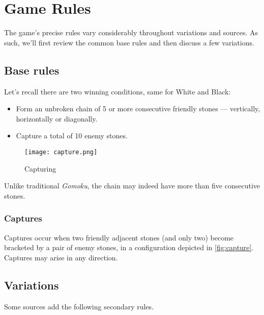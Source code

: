 \documentclass[12pt,a4paper,notitlepage]{article}
\begin{document}
\section{Game Rules}
\label{sec:rules}

The game's precise rules vary considerably throughout variations and sources. As such, we'll first review the common base rules and then discuss a few variations.

\subsection{Base rules}
\label{subsec:baserules}

Let's recall there are two winning conditions, same for White and Black:

\begin{itemize}
	\large
	\item Form an unbroken chain of 5 or more consecutive friendly stones --- vertically, horizontally or diagonally.
	\item Capture a total of 10 enemy stones.
\end{itemize}

\begin{wrapfigure}[8]{r}[2em]{0.3\textwidth}
	\vspace*{-3\baselineskip}
	\texttt{[image: capture.png]}
	\caption{Capturing\supercite{pente-net} \label{fig:capture}}
\end{wrapfigure}

Unlike traditional \textit{Gomoku}, the chain may indeed have more than five consecutive stones.

\subsubsection{Captures}
\label{subsubsec:captures}

Captures occur when two friendly adjacent stones (and only two) become bracketed by a pair of enemy stones, in a configuration depicted in \autoref{fig:capture}. Captures may arise in any direction.

\subsection{Variations}
\label{subsec:variations}

Some sources add the following secondary rules.
\end{document}

